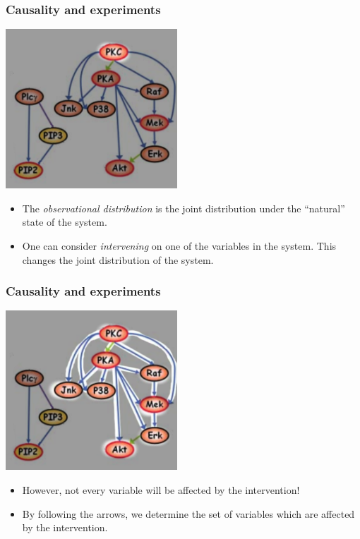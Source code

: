 \documentclass{beamer}
\begin{document}
\begin{frame}
\frametitle{Causality and experiments}
\begin{center}
\includegraphics[scale = 0.5]{../images/fig02_01.png}
\end{center}

\begin{itemize}
\item The \emph{observational distribution} is the joint distribution under the ``natural'' state of the system.
\item One can consider \emph{intervening} on one of the variables in the system.  This changes the joint distribution of the system.
\end{itemize}

\end{frame}

\begin{frame}
\frametitle{Causality and experiments}

\begin{center}
\includegraphics[scale = 0.5]{../images/fig02_02.png}
\end{center}

\begin{itemize}
\item However, not every variable will be affected by the intervention!
\item By following the arrows, we determine the set of variables which are affected by the intervention.
\end{itemize}

\end{frame}
\end{document}
